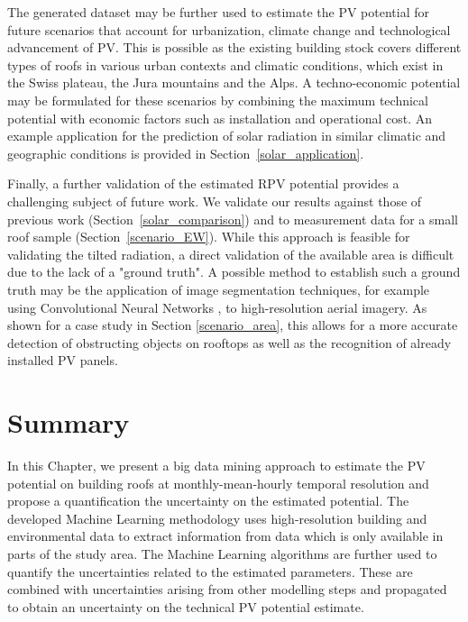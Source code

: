 The generated dataset may be further used to estimate the PV potential for future scenarios that account for urbanization, climate change and technological advancement of PV.
This is possible as the existing building stock covers different types of roofs in various urban contexts and climatic conditions, which exist in the Swiss plateau, the Jura mountains and the Alps. 
A techno-economic potential may be formulated for these scenarios by combining the maximum technical potential with economic factors such as installation and operational cost.
An example application for the prediction of solar radiation in similar climatic and geographic conditions is provided in Section~\ref{solar_application}.

Finally, a further validation of the estimated RPV potential provides a challenging subject of future work. 
We validate our results against those of previous work (Section~\ref{solar_comparison}) and to measurement data for a small roof sample (Section~\ref{scenario_EW}).
While this approach is feasible for validating the tilted radiation, a direct validation of the available area is difficult due to the lack of a "ground truth". A possible method to establish such a ground truth may be the application of image segmentation techniques, for example using Convolutional Neural Networks \cite{castello_deep_2019}, to high-resolution aerial imagery. 
As shown for a case study in Section \ref{scenario_area}, this allows for a more accurate detection of obstructing objects on rooftops as well as the recognition of already installed PV panels.

\section{Summary}
\label{solar_conclusion}

In this Chapter, we present a big data mining approach to estimate the PV potential on building roofs at monthly-mean-hourly temporal resolution and propose a quantification the uncertainty on the estimated potential. 
The developed Machine Learning methodology uses high-resolution building and environmental data to extract information from data which is only available in parts of the study area.
%
The Machine Learning algorithms are further used to quantify the uncertainties related to the estimated parameters. These are combined with uncertainties arising from other modelling steps and propagated to obtain an uncertainty on the technical PV potential estimate. 

